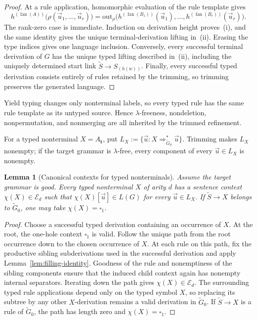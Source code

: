 \documentclass[11pt]{article}
\numberwithin{equation}{section}
\theoremstyle{plain}
\newtheorem{lemma}[theorem]{Lemma}
\theoremstyle{definition}
\theoremstyle{remark}
\newcommand{\out}{\mathrm{out}}
\newcommand{\tuple}[1]{\vec{#1}}
\newcommand{\blank}{\square}
\newcommand{\fan}{\operatorname{fan}}
\begin{document}
\begin{proof}
At a rule application, homomorphic evaluation of the rule template gives
\[
  h^{(\fan(A))}
  \bigl(\rho(\tuple u_1,\ldots,\tuple u_r)\bigr)
  =
  \out_\rho
  \bigl(h^{(\fan(B_1))}(\tuple u_1),\ldots,
        h^{(\fan(B_r))}(\tuple u_r)\bigr).
\]
The rank-zero case is immediate.  Induction on derivation height proves~(i),
and the same identity gives the unique terminal-derivation lifting in~(ii).  Erasing the
type indices gives one language inclusion.  Conversely, every successful
terminal derivation of \(G\) has the unique typed lifting described in~(ii),
including the uniquely determined start link
\(\widetilde S\to S_{(h(w))}\).  Finally, every successful typed derivation
consists entirely of rules retained by the trimming, so trimming preserves the
generated language.
\end{proof}

Yield typing changes only nonterminal labels, so every typed rule has the
same rule template as its untyped source.  Hence $\lambda$-freeness,
nondeletion, nonpermutation, and nonmerging are all inherited by the trimmed
refinement.

For a typed nonterminal $X=A_{\mathbf t}$, put
$L_X:=\{\tuple u:X\Rightarrow_{\widetilde G_0}^*\tuple u\}$.  Trimming makes
$L_X$ nonempty; if the target grammar is $\lambda$-free, every component
of every $\tuple u\in L_X$ is nonempty.

\begin{lemma}[Canonical contexts for typed nonterminals]
\label{lem:identity-canonical-contexts}
Assume the target grammar is good.  Every typed nonterminal $X$ of arity $d$ has a sentence context
$\chi(X)\in\mathcal E_d$ such that
$\chi(X)[\tuple u]\in L(G)$ for every $\tuple u\in L_X$.  If
$\widetilde S\to X$ belongs to $\widetilde G_0$, one may take $\chi(X)=\blank_1$.
\end{lemma}

\begin{proof}
Choose a successful typed derivation containing an occurrence of $X$.  At the
root, the one-hole context $\blank_1$ is valid.  Follow the unique path from
the root occurrence down to the chosen occurrence of $X$.  At each rule on
this path, fix the productive sibling subderivations used in the successful
derivation and apply Lemma~\ref{lem:filling-identity}.  Goodness of the rule
and nonemptiness of the sibling components ensure that the induced child
context again has nonempty internal separators.  Iterating down the path gives
$\chi(X)\in\mathcal E_d$.  The surrounding typed rule applications depend only on the typed symbol
$X$, so replacing its subtree by any other $X$-derivation remains a valid
derivation in $\widetilde G_0$.  If $\widetilde S\to X$ is a rule of
$\widetilde G_0$, the path has length zero and $\chi(X)=\blank_1$.
\end{proof}
\end{document}
